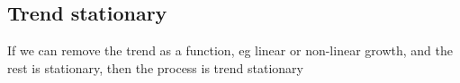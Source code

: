 
\subsection{Trend stationary}

If we can remove the trend as a function, eg linear or non-linear growth, and the rest is stationary, then the process is trend stationary

